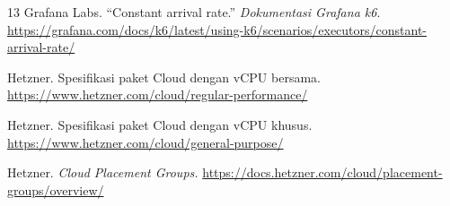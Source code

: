 \begin{thebibliography}{13}
Grafana Labs. \textquotedblleft{}Constant arrival rate.\textquotedblright{} \emph{Dokumentasi Grafana k6}.
\url{https://grafana.com/docs/k6/latest/using-k6/scenarios/executors/constant-arrival-rate/}

Hetzner. Spesifikasi paket Cloud dengan vCPU bersama.
\url{https://www.hetzner.com/cloud/regular-performance/}

Hetzner. Spesifikasi paket Cloud dengan vCPU khusus.
\url{https://www.hetzner.com/cloud/general-purpose/}

Hetzner. \emph{Cloud Placement Groups.}
\url{https://docs.hetzner.com/cloud/placement-groups/overview/}

\end{thebibliography}
